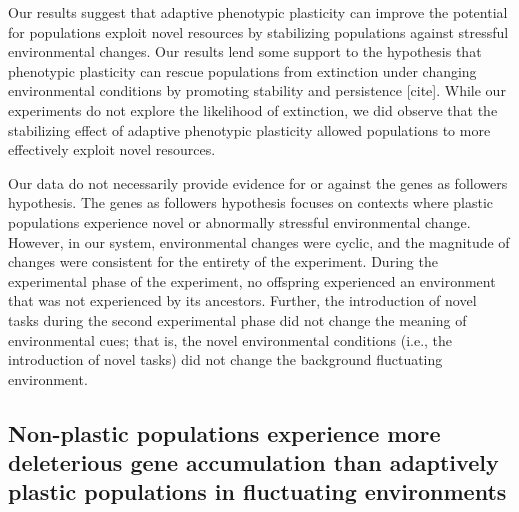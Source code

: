 Our results suggest that adaptive phenotypic plasticity can improve the potential for populations exploit novel resources by stabilizing populations against stressful environmental changes.
Our results lend some support to the hypothesis that phenotypic plasticity can rescue populations from extinction under changing environmental conditions by promoting stability and persistence [cite].
While our experiments do not explore the likelihood of extinction, we did observe that the stabilizing effect of adaptive phenotypic plasticity allowed populations to more effectively exploit novel resources.

Our data do not necessarily provide evidence for or against the genes as followers hypothesis.
The genes as followers hypothesis focuses on contexts where plastic populations experience novel or abnormally stressful environmental change.
However, in our system, environmental changes were cyclic, and the magnitude of changes were consistent for the entirety of the experiment.
During the experimental phase of the experiment, no offspring experienced an environment that was not experienced by its ancestors.
Further, the introduction of novel tasks during the second experimental phase did not change the meaning of environmental cues; that is, the novel environmental conditions (i.e., the introduction of novel tasks) did not change the background fluctuating environment.

\vspace{0.25cm}
\subsection{Non-plastic populations experience more deleterious gene accumulation than adaptively plastic populations in fluctuating environments}


